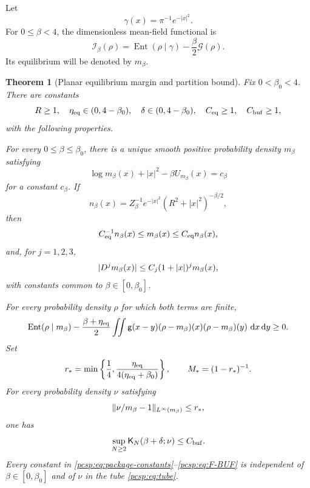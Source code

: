 \documentclass[11pt,reqno]{amsart}
\numberwithin{equation}{section}
\theoremstyle{plain}
\newtheorem{thm}{Theorem}[section]
\theoremstyle{definition}
\DeclarePairedDelimiter{\abs}{\lvert}{\rvert}
\DeclarePairedDelimiter{\norm}{\lVert}{\rVert}
\newcommand{\dd}{\mathop{}\!\mathrm d}
\newcommand{\be}{\beta}
\newcommand{\g}{\mathsf g}
\newcommand{\K}{\mathsf K}
\newcommand{\Ent}{\operatorname{Ent}}
\newcommand{\Gcal}{\mathcal G}
\begin{document}
Let
\begin{equation}\label{pcsp:eq:gaussian-reference}
 \gamma(x)=\pi^{-1}e^{-|x|^2}.
\end{equation}
For $0\leq\be<4$, the dimensionless mean-field functional is
\begin{equation}\label{pcsp:eq:mean-field-functional}
 \mathcal I_\be(\rho)
 =\Ent(\rho\mid\gamma)-\frac\be2\Gcal(\rho).
\end{equation}
Its equilibrium will be denoted by $m_\be$.

\begin{thm}[Planar equilibrium margin and partition bound]\label{thm:planar-confined-static-package}
Fix $0<\be_0<4$.  There are constants
\begin{equation}\label{pcsp:eq:package-constants}
 R\geq1,
 \quad
 \eta_{\rm eq}\in(0,4-\be_0),
 \quad
 \delta\in(0,4-\be_0),
 \quad
 C_{\rm eq}\geq1,
 \quad
 C_{\rm buf}\geq1,
\end{equation}
with the following properties.

For every $0\leq\be\leq\be_0$, there is a unique smooth positive probability density $m_\be$ satisfying
\begin{equation}\label{pcsp:eq:euler-lagrange}
 \log m_\be(x)+|x|^2-\be U_{m_\be}(x)=c_\be
\end{equation}
for a constant $c_\be$.  If
\begin{equation}\label{pcsp:eq:comparison-density}
 n_\be(x)=Z_\be^{-1}e^{-|x|^2}(R^2+|x|^2)^{-\be/2},
\end{equation}
then
\begin{equation}\label{pcsp:eq:equilibrium-envelope}
 C_{\rm eq}^{-1}n_\be(x)\leq m_\be(x)\leq C_{\rm eq}n_\be(x),
\end{equation}
and, for $j=1,2,3$,
\begin{equation}\label{pcsp:eq:equilibrium-derivatives}
 \abs{D^jm_\be(x)}\leq C_j(1+|x|)^jm_\be(x),
\end{equation}
with constants common to $\be\in[0,\be_0]$.

For every probability density $\rho$ for which both terms are finite,
\begin{equation}\label{pcsp:eq:F-EQ}
 \Ent(\rho\mid m_\be)
 -\frac{\be+\eta_{\rm eq}}2
 \iint\g(x-y)(\rho-m_\be)(x)(\rho-m_\be)(y)\,\dd x\dd y
 \geq0.
\end{equation}
Set
\begin{equation}\label{pcsp:eq:frozen-radius}
 r_*=\min\left\{\frac14,
 \frac{\eta_{\rm eq}}{4(\eta_{\rm eq}+\be_0)}\right\},
 \qquad
 M_*=(1-r_*)^{-1}.
\end{equation}
For every probability density $\nu$ satisfying
\begin{equation}\label{pcsp:eq:tube}
 \norm{\nu/m_\be-1}_{L^\infty(m_\be)}\leq r_*,
\end{equation}
one has
\begin{equation}\label{pcsp:eq:F-BUF}
 \sup_{N\geq2}\K_N(\be+\delta;\nu)\leq C_{\rm buf}.
\end{equation}
Every constant in \eqref{pcsp:eq:package-constants}--\eqref{pcsp:eq:F-BUF} is independent of $\be\in[0,\be_0]$ and of $\nu$ in the tube \eqref{pcsp:eq:tube}.
\end{thm}
\end{document}
